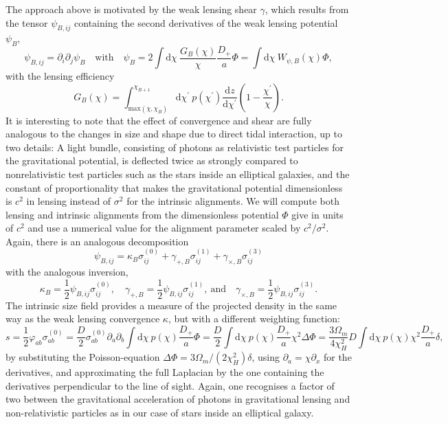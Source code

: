 \documentclass[a4paper,fleqn,usenatbib]{mnras}
\newcommand{\dd}{\mathrm{d}}
\begin{document}
The approach above is motivated by the weak lensing shear $\gamma$, which results from the tensor $\psi_{B,ij}$ containing the second derivatives of the weak lensing potential $\psi_B$,
\begin{equation}
\psi_{B,ij} = \partial_i\partial_j\psi_B
\quad\mathrm{with}\quad
\psi_B = 2\int\dd\chi\:\frac{G_B(\chi)}{\chi}\frac{D_+}{a}\Phi = \int\dd\chi\:W_{\psi,B}(\chi)\Phi,
\end{equation}
with the lensing efficiency
\begin{equation}
G_B(\chi) = \int_{\mathrm{max}(\chi,\chi_B)}^{\chi_{B+1}}\dd\chi^\prime\:p(\chi^\prime)\frac{\dd z}{\dd\chi^\prime}\left(1-\frac{\chi^\prime}{\chi}\right).
\end{equation}
It is interesting to note that the effect of convergence and shear are fully analogous to the changes in size and shape due to direct tidal interaction, up to two details: A light bundle, consisting of photons as relativistic test particles for the gravitational potential, is deflected twice as strongly compared to nonrelativistic test particles such as the stars inside an elliptical galaxies, and the constant of proportionality that makes the gravitational potential dimensionless is $c^2$ in lensing instead of $\sigma^2$ for the intrinsic alignments. We will compute both lensing and intrinsic alignments from the dimensionless potential $\Phi$ give in units of $c^2$ and use a numerical value for the alignment parameter scaled by $c^2/\sigma^2$. Again, there is an analogous decomposition
\begin{equation}
\psi_{B,ij} = \kappa_B\sigma^{(0)}_{ij} + \gamma_{+,B}\sigma^{(1)}_{ij} +\gamma_{\times,B}\sigma^{(3)}_{ij}
\end{equation}
with the analogous inversion,
\begin{equation}
\kappa_B = \frac{1}{2}\psi_{B,ij}\sigma^{(0)}_{ij},
\quad
\gamma_{+,B} = \frac{1}{2}\psi_{B,ij}\sigma^{(1)}_{ij},
\mathrm{~and}\quad
\gamma_{\times,B} = \frac{1}{2}\psi_{B,ij}\sigma^{(3)}_{ij}.
\end{equation}
The intrinsic size field provides a measure of the projected density in the same way as the weak lensing convergence $\kappa$, but with a different weighting function:
\begin{equation}
s = 
\frac{1}{2}\varphi_{ab}\sigma^{(0)}_{ab} = 
\frac{D}{2}\sigma^{(0)}_{ab}\partial_a\partial_b\int\dd\chi\: p(\chi)\frac{D_+}{a}\Phi = 
\frac{D}{2}\int\dd\chi\:p(\chi)\frac{D_+}{a}\chi^2\Delta\Phi = 
\frac{3\Omega_m}{4\chi_H^2}D\int\dd\chi\:p(\chi)\chi^2 \frac{D_+}{a}\delta,
\end{equation}
by substituting the Poisson-equation $\Delta\Phi = 3\Omega_m/(2\chi_H^2)\delta$, using $\partial_a = \chi\partial_x$ for the derivatives, and approximating the full Laplacian by the one containing the derivatives perpendicular to the line of sight. Again, one recognises a factor of two between the gravitational acceleration of photons in gravitational lensing and non-relativistic particles as in our case of stars inside an elliptical galaxy.
\end{document}

